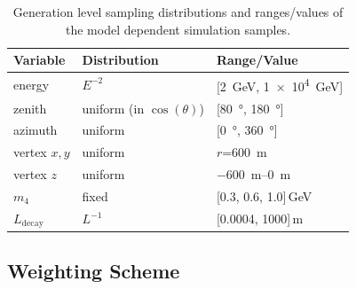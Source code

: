 \begin{table}[h]
    \centering
    \begin{tabular} { lll }
        \hline \hline 
        \textbf{Variable} & \textbf{Distribution} & \textbf{Range/Value} \\
        \hline \hline 
        energy & $E^{-2}$ & [\SI{2}{\GeV}, \SI{1e4}{\GeV}] \\
        zenith & uniform (in $\cos(\theta)$) & [\SI{80}{\degree}, \SI{180}{\degree}] \\
        azimuth & uniform & [\SI{0}{\degree}, \SI{360}{\degree}] \\
        vertex $x,y$ & uniform & $r$=\SI{600}{\metre} \\
        vertex $z$ & uniform & \SIrange{-600}{0}{\metre} \\
        $m_\mathrm{4}$ & fixed & [0.3, 0.6, 1.0]\,\si{\GeV} \\
        $L_\mathrm{decay}$ & $L^{-1}$ & [0.0004, 1000]\,\si{\metre} \\
        \hline
    \end{tabular}
    \caption[Model dependent simulation sampling distributions]{Generation level sampling distributions and ranges/values of the model dependent simulation samples.}
\end{table}


\subsection{Weighting Scheme}

